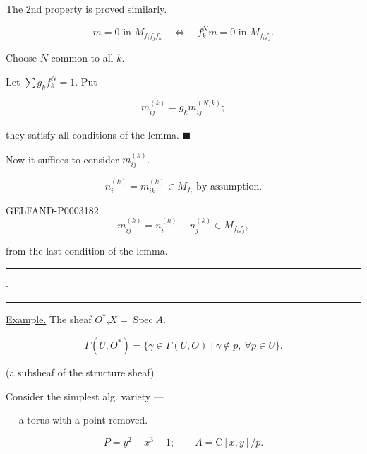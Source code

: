 The 2nd property is proved similarly.

\begin{equation*}m=0\text{ in }M_{f_i f_j f_k}\quad\Longleftrightarrow\quad f_k^N m=0\text{ in }M_{f_i f_j}.\end{equation*}

Choose $N$ common to all $k$.

Let $\sum g_k f_k^N=1$. Put

\begin{equation*}\underline{m_{ij}^{(k)}=g_k m_{ij}^{(N, k)}};\end{equation*}

they satisfy all conditions of the lemma. $\blacksquare$

Now it suffices to consider $m_{ij}^{(k)}$.

\begin{equation*}n_i^{(k)}=m_{ik}^{(k)}\in M_{f_i}\text{ by assumption.}\end{equation*}

\begin{GelfandAdjacentEvidence}{GELFAND-P000318}{2}
\begin{equation*}m_{ij}^{(k)}=n_i^{(k)}-n_j^{(k)}\in M_{f_i f_j},\end{equation*}

\end{GelfandAdjacentEvidence}


from the last condition of the lemma.

\begin{center}\rule{20mm}{.6pt}\quad $\cdot$\quad\rule{20mm}{.6pt}\end{center}

\uline{Example.} The sheaf $O^*$,\quad $X=\operatorname{Spec}A$.

\begin{equation*}\Gamma (U, O^*)=\{\gamma\in\Gamma (U, O)\mid\gamma\notin p,\ \forall p\in U\}.\end{equation*}

(a subsheaf of the structure sheaf)

Consider the simplest alg. variety ---

--- a torus with a point removed.

\begin{equation*}P=y^2-x^3+1;\qquad A=\mathrm C[x, y]/p.\end{equation*}

